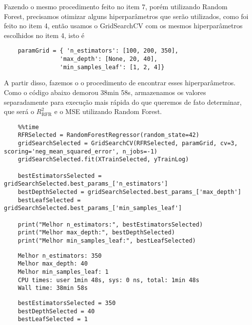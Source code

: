 Fazendo o mesmo procedimento feito no item 7, porém utilizando Random Forest, precisamos otimizar alguns hiperparâmetros que serão utilizados, como foi feito no item 4, então usamos o GridSearchCV com os mesmos hiperparâmetros escolhidos no item 4, isto é
\begin{longlisting}
    \begin{verbatim}
    paramGrid = { 'n_estimators': [100, 200, 350],
                'max_depth': [None, 20, 40],
                'min_samples_leaf': [1, 2, 4]}
    \end{verbatim}
\end{longlisting}

A partir disso, fazemos o o procedimento de encontrar esses hiperparâmetros. Como o código abaixo demorou 38min 58s, armazenamos os valores separadamente para execução mais rápida do que queremos de fato determinar, que será o $R^{2}_{\text{RFR}}$ e o MSE utilizando Random Forest.
\begin{longlisting}
    \begin{verbatim}
    %%time
    RFRSelected = RandomForestRegressor(random_state=42)
    gridSearchSelected = GridSearchCV(RFRSelected, paramGrid, cv=3, scoring='neg_mean_squared_error', n_jobs=-1)
    gridSearchSelected.fit(XTrainSelected, yTrainLog)

    bestEstimatorsSelected = gridSearchSelected.best_params_['n_estimators']
    bestDepthSelected = gridSearchSelected.best_params_['max_depth']
    bestLeafSelected = gridSearchSelected.best_params_['min_samples_leaf']

    print("Melhor n_estimators:", bestEstimatorsSelected)
    print("Melhor max_depth:", bestDepthSelected)
    print("Melhor min_samples_leaf:", bestLeafSelected)
    \end{verbatim}
\end{longlisting}
\begin{verbatim}
    Melhor n_estimators: 350
    Melhor max_depth: 40
    Melhor min_samples_leaf: 1
    CPU times: user 1min 48s, sys: 0 ns, total: 1min 48s
    Wall time: 38min 58s
\end{verbatim}

\begin{longlisting}
    \begin{verbatim}
    bestEstimatorsSelected = 350
    bestDepthSelected = 40
    bestLeafSelected = 1
    \end{verbatim}
\end{longlisting}


